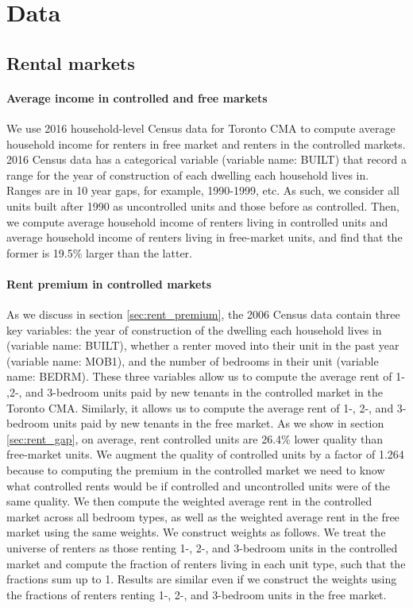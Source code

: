 \documentclass[parskip=full]{article}
\begin{document}
\section{Data}\label{appendix:data}

\subsection{Rental markets}

\paragraph{Average income in controlled and free markets}
We use 2016 household-level Census data for Toronto CMA to compute average household income for renters in free market and renters in the controlled markets. 2016 Census data has a categorical variable (variable name: BUILT) that record a range for the year of construction of each dwelling each household lives in. Ranges are in 10 year gaps, for example, 1990-1999, etc. As such, we consider all units built after 1990 as uncontrolled units and those before as controlled. Then, we compute average household income of renters living in controlled units and average household income of renters living in free-market units, and find that the former is 19.5\% larger than the latter.

\paragraph{Rent premium in controlled markets}

As we discuss in section \ref{sec:rent_premium}, the 2006 Census data contain three key variables: the year of construction of the dwelling each household lives in (variable name: BUILT), whether a renter moved into their unit in the past year (variable name: MOB1), and the number of bedrooms in their unit (variable name: BEDRM). These three variables allow us to compute the average rent of 1- ,2-, and 3-bedroom units paid by new tenants in the controlled market in the Toronto CMA. Similarly, it allows us to compute the average rent of 1-, 2-, and 3-bedroom units paid by new tenants in the free market. As we show in section \ref{sec:rent_gap}, on average, rent controlled units are 26.4\% lower quality than free-market units. We augment the quality of controlled units by a factor of 1.264 because to computing the premium in the controlled market we need to know what controlled rents would be if controlled and uncontrolled units were of the same quality. We then compute the weighted average rent in the controlled market across all bedroom types, as well as the weighted average rent in the free market using the same weights. We construct weights as follows. We treat the universe of renters as those renting 1-, 2-, and 3-bedroom units in the controlled market and compute the fraction of renters living in each unit type, such that the fractions sum up to 1. Results are similar even if we construct the weights using the fractions of renters renting 1-, 2-, and 3-bedroom units in the free market.
\end{document}

